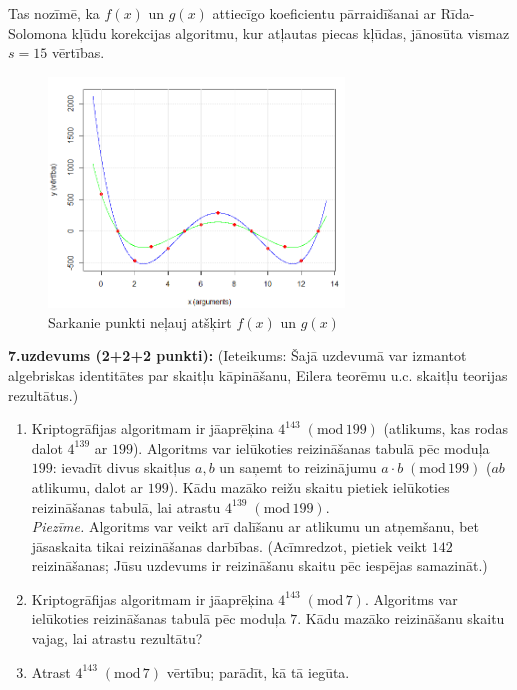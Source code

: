 \documentclass[a4paper,12pt]{article}
\begin{document}
{Tas nozīmē, ka $f(x)$ un $g(x)$ attiecīgo koeficientu pārraidīšanai ar Rīda-Solomona kļūdu korekcijas algoritmu, 
kur atļautas piecas kļūdas, jānosūta vismaz $s = 15$ vērtības. 

\begin{figure}[h!]
\begin{center}
\includegraphics[width=0.7\textwidth]{fall2019-midterm/reed-solomon-plot.png}
\caption{Sarkanie punkti neļauj atšķirt $f(x)$ un $g(x)$\label{fig:reed-solomon-plot}}
\end{center}
\end{figure}

}



\vspace{6pt}
{\bf 7.uzdevums (2+2+2 punkti):} 
(Ieteikums: Šajā uzdevumā var izmantot algebriskas identitātes par skaitļu kāpināšanu, Eilera teorēmu u.c. skaitļu teorijas rezultātus.)
\begin{enumerate}
\item Kriptogrāfijas algoritmam ir jāaprēķina $4^{143}\;(\text{mod}\,199)$ (atlikums, kas rodas dalot $4^{139}$ ar $199$). 
Algoritms var ielūkoties reizināšanas tabulā pēc moduļa $199$: ievadīt divus skaitļus $a,b$ un saņemt to reizinājumu 
$a\cdot{}b\;(\text{mod}\,199)$ ($ab$ atlikumu, dalot ar $199$).
Kādu mazāko reižu skaitu pietiek ielūkoties reizināšanas tabulā, lai atrastu $4^{139}\;(\text{mod}\,199)$.\\
{\em Piezīme.} Algoritms var veikt arī dalīšanu ar atlikumu un atņemšanu, bet jāsaskaita tikai reizināšanas darbības.
(Acīmredzot, pietiek veikt $142$ reizināšanas; Jūsu uzdevums ir reizināšanu skaitu pēc iespējas samazināt.)
\item Kriptogrāfijas algoritmam ir jāaprēķina $4^{143}\;(\text{mod}\,7)$. Algoritms var ielūkoties reizināšanas tabulā 
pēc moduļa $7$. Kādu mazāko reizināšanu skaitu vajag, lai atrastu rezultātu? 
\item Atrast $4^{143}\;(\text{mod}\,7)$ vērtību; parādīt, kā tā iegūta.
\end{enumerate}
\end{document}
